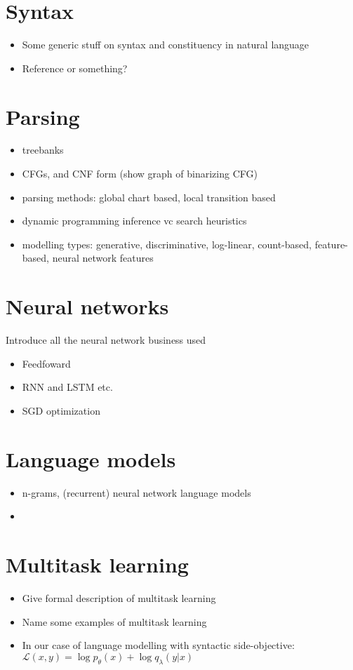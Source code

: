 

\section{Syntax}
\begin{itemize}
  \item Some generic stuff on syntax and constituency in natural language
  \item Reference \cite{Carnie2010:constituent,Everaert+2015:structures} or something?
\end{itemize}

\section{Parsing}
\begin{itemize}
  \item treebanks
  \item CFGs, and CNF form (show graph of binarizing CFG)
  \item parsing methods: global chart based, local transition based
  \item dynamic programming inference vc search heuristics
  \item modelling types: generative, discriminative, log-linear, count-based, feature-based, neural network features
\end{itemize}

\section{Neural networks}
Introduce all the neural network business used
\begin{itemize}
  \item Feedfoward
  \item RNN and LSTM etc.
  \item SGD optimization
\end{itemize}

\section{Language models}
\begin{itemize}
  \item n-grams, (recurrent) neural network language models
  \item
\end{itemize}

\section{Multitask learning}
\begin{itemize}
  \item Give formal description of multitask learning
  \item Name some examples of multitask learning \cite{Zhang+2016:multitask,Goldberg+2016:multitask,Swayamdipta+2018:scaffold}
  \item In our case of language modelling with syntactic side-objective: $\mathcal{L}(x, y) = \log p_{\theta}(x) + \log q_{\lambda}(y|x)$
\end{itemize}
